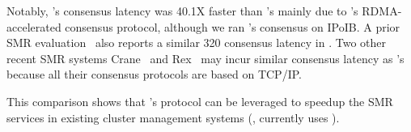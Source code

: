 Notably, \xxx's consensus latency was 40.1X faster than \zookeeper's mainly due 
to \xxx's RDMA-accelerated consensus protocol, although we ran \calvin's 
\zookeeper consensus on IPoIB. A prior SMR evaluation~\cite{dare:hpdc15} also 
reports a similar 320 \us consensus latency in \zookeeper. Two other recent SMR 
systems Crane~\cite{crane:sosp15} and Rex~\cite{rex:eurosys14} may incur 
similar consensus latency as \zookeeper's because all their consensus protocols 
are based on TCP/IP.

This comparison shows that \xxx's \paxos protocol can be leveraged to speedup 
the SMR services in existing cluster management systems (\eg, \mesos currently 
uses \zookeeper).







% 


